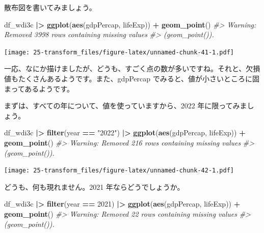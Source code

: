 \documentclass[
  xelatex, ja=standard]{bxjsbook}
\newenvironment{Shaded}{\begin{snugshade}}{\end{snugshade}}
\newcommand{\CommentTok}[1]{\textcolor[rgb]{0.56,0.35,0.01}{\textit{#1}}}
\newcommand{\DecValTok}[1]{\textcolor[rgb]{0.00,0.00,0.81}{#1}}
\newcommand{\FunctionTok}[1]{\textcolor[rgb]{0.13,0.29,0.53}{\textbf{#1}}}
\newcommand{\NormalTok}[1]{#1}
\newcommand{\SpecialCharTok}[1]{\textcolor[rgb]{0.81,0.36,0.00}{\textbf{#1}}}
\newcommand{\StringTok}[1]{\textcolor[rgb]{0.31,0.60,0.02}{#1}}
\theoremstyle{definition}
\theoremstyle{definition}
\theoremstyle{definition}
\theoremstyle{definition}
\theoremstyle{remark}
\begin{document}
散布図を書いてみましょう。

\begin{Shaded}
\begin{Highlighting}[]
\NormalTok{df\_wdi3c }\SpecialCharTok{|\textgreater{}} \FunctionTok{ggplot}\NormalTok{(}\FunctionTok{aes}\NormalTok{(gdpPercap, lifeExp)) }\SpecialCharTok{+} \FunctionTok{geom\_point}\NormalTok{()}
\CommentTok{\#\textgreater{} Warning: Removed 3998 rows containing missing values}
\CommentTok{\#\textgreater{} (\textasciigrave{}geom\_point()\textasciigrave{}).}
\end{Highlighting}
\end{Shaded}

\texttt{[image: 25-transform\_files/figure-latex/unnamed-chunk-41-1.pdf]}

一応、なにか描けましたが、どうも、すごく点の数が多いですね。それと、欠損値もたくさんあるようです。また、gdpPercap でみると、値が小さいところに固まってあるようです。

まずは、すべての年について、値を使っていますから、2022 年に限ってみましょう。

\begin{Shaded}
\begin{Highlighting}[]
\NormalTok{df\_wdi3c }\SpecialCharTok{|\textgreater{}} \FunctionTok{filter}\NormalTok{(year }\SpecialCharTok{==} \StringTok{"2022"}\NormalTok{) }\SpecialCharTok{|\textgreater{}}
  \FunctionTok{ggplot}\NormalTok{(}\FunctionTok{aes}\NormalTok{(gdpPercap, lifeExp)) }\SpecialCharTok{+} \FunctionTok{geom\_point}\NormalTok{()}
\CommentTok{\#\textgreater{} Warning: Removed 216 rows containing missing values}
\CommentTok{\#\textgreater{} (\textasciigrave{}geom\_point()\textasciigrave{}).}
\end{Highlighting}
\end{Shaded}

\texttt{[image: 25-transform\_files/figure-latex/unnamed-chunk-42-1.pdf]}

どうも、何も現れません。2021 年ならどうでしょうか。

\begin{Shaded}
\begin{Highlighting}[]
\NormalTok{df\_wdi3c }\SpecialCharTok{|\textgreater{}} \FunctionTok{filter}\NormalTok{(year }\SpecialCharTok{==} \DecValTok{2021}\NormalTok{) }\SpecialCharTok{|\textgreater{}}
  \FunctionTok{ggplot}\NormalTok{(}\FunctionTok{aes}\NormalTok{(gdpPercap, lifeExp)) }\SpecialCharTok{+} \FunctionTok{geom\_point}\NormalTok{()}
\CommentTok{\#\textgreater{} Warning: Removed 22 rows containing missing values}
\CommentTok{\#\textgreater{} (\textasciigrave{}geom\_point()\textasciigrave{}).}
\end{Highlighting}
\end{Shaded}
\end{document}
